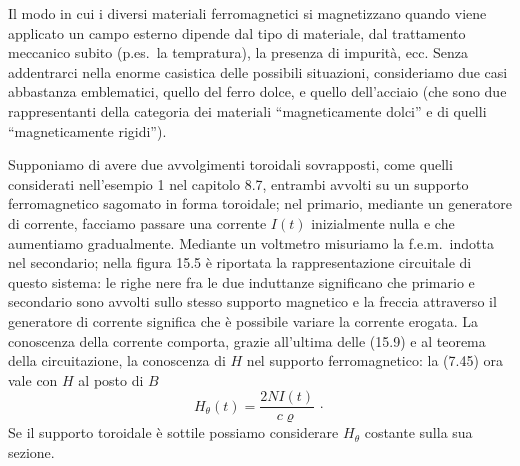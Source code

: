 Il modo in cui i diversi materiali ferromagnetici si magnetizzano quando viene
applicato un campo esterno dipende dal tipo di materiale, dal trattamento
meccanico subito (p.es.\ la tempratura), la presenza di impurit\`a, ecc. Senza
addentrarci nella enorme casistica delle possibili situazioni, consideriamo due
casi abbastanza emblematici, quello del ferro dolce, e quello dell'acciaio (che
sono due rappresentanti della categoria dei materiali ``magneticamente dolci'' e
di quelli ``magneticamente rigidi'').

Supponiamo di avere due avvolgimenti toroidali sovrapposti, come quelli
considerati nell'esempio 1 nel capitolo 8.7, entrambi avvolti su un supporto
ferromagnetico sagomato in forma toroidale; nel primario, mediante un generatore
di corrente, facciamo passare una corrente $I(t)$ inizialmente nulla e che
aumentiamo gradualmente. Mediante un voltmetro misuriamo la f.e.m.\ indotta nel
secondario; nella figura 15.5 \`e riportata la rappresentazione circuitale di
questo sistema: le righe nere fra le due induttanze significano che primario e
secondario sono avvolti sullo stesso supporto magnetico e la freccia attraverso
il generatore di corrente significa che \`e possibile variare la corrente
erogata.
La conoscenza della corrente comporta, grazie all'ultima delle (15.9) e al
teorema della circuitazione, la conoscenza di $H$ nel supporto ferromagnetico:
la (7.45) ora vale con $H$ al posto di $B$
\begin{equation}
  H_\theta(t)=\frac{2NI(t)}{c\varrho}\,\cdot
  \tag{15.49}
\end{equation}
Se il supporto toroidale \`e sottile possiamo considerare $H_\theta$ costante
sulla sua sezione.


